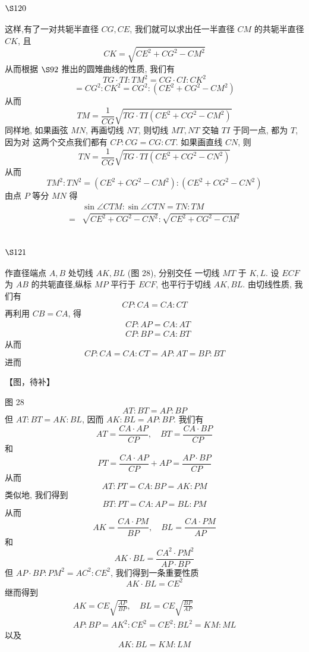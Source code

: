 \section{$\S 120$}

这样,有了一对共轭半直径 $C G, C E$, 我们就可以求出任一半直径 $C M$ 的共轭半直径 $C K$, 且
\[
C K=\sqrt{C E^{2}+C G^{2}-C M^{2}}
\]
从而根据 $\S 92$ 推出的圆雉曲线的性质, 我们有
\[
T G \cdot T I: T M^{2}=C G \cdot C I: C K^{2}
\]
\[
=C G^{2}: C K^{2}=C G^{2}:\left(C E^{2}+C G^{2}-C M^{2}\right)
\]
从而
\[
T M=\frac{1}{C G} \sqrt{T G \cdot T I\left(C E^{2}+C G^{2}-C M^{2}\right)}
\]
同样地, 如果画弦 $M N$, 再画切线 $N T$, 则切线 $M T, N T$ 交轴 $T I$ 于同一点, 都为 $T$, 因为对 这两个交点我们都有 $C P: C G=C G: C T$. 如果画直线 $C N$, 则
\[
T N=\frac{1}{C G} \sqrt{T G \cdot T I\left(C E^{2}+C G^{2}-C N^{2}\right)}
\]
从而
\[
T M^{2}: T N^{2}=\left(C E^{2}+C G^{2}-C M^{2}\right):\left(C E^{2}+C G^{2}-C N^{2}\right)
\]
由点 $P$ 等分 $M N$ 得
\[
\begin{aligned}
& \sin \angle C T M: \sin \angle C T N=T N: T M \\
= & \sqrt{C E^{2}+C G^{2}-C N^{2}}: \sqrt{C E^{2}+C G^{2}-C M^{2}}
\end{aligned}
\]
\section{$\S 121$}

作直径端点 $A, B$ 处切线 $A K, B L$ (图 28), 分别交任 一切线 $M T$ 于 $K, L$. 设 $E C F$ 为 $A B$ 的共轭直径,纵标 $M P$ 平行于 $E C F$, 也平行于切线 $A K, B L$. 由切线性质, 我 们有
\[
C P: C A=C A: C T
\]
再利用 $C B=C A$, 得
\[
\begin{aligned}
& C P: A P=C A: A T \\
& C P: B P=C A: B T
\end{aligned}
\]
从而
\[
C P: C A=C A: C T=A P: A T=B P: B T
\]
进而


【图，待补】

图 28
\[
A T: B T=A P: B P
\]
但 $A T: B T=A K: B L$, 因而 $A K: B L=A P: B P$. 我们有
\[
A T=\frac{C A \cdot A P}{C P}, \quad B T=\frac{C A \cdot B P}{C P}
\]
和
\[
P T=\frac{C A \cdot A P}{C P}+A P=\frac{A P \cdot B P}{C P}
\]
从而
\[
A T: P T=C A: B P=A K: P M
\]
类似地, 我们得到
\[
B T: P T=C A: A P=B L: P M
\]
从而
\[
A K=\frac{C A \cdot P M}{B P}, \quad B L=\frac{C A \cdot P M}{A P}
\]
和
\[
A K \cdot B L=\frac{C A^{2} \cdot P M^{2}}{A P \cdot B P}
\]
但 $A P \cdot B P: P M^{2}=A C^{2}: C E^{2}$, 我们得到一条重要性质
\[
A K \cdot B L=C E^{2}
\]
继而得到
\[
\begin{gathered}
A K=C E \sqrt{\frac{A P}{B P}}, \quad B L=C E \sqrt{\frac{B P}{A P}} \\
A P: B P=A K^{2}: C E^{2}=C E^{2}: B L^{2}=K M: M L
\end{gathered}
\]
以及
\[
A K: B L=K M: L M
\]
